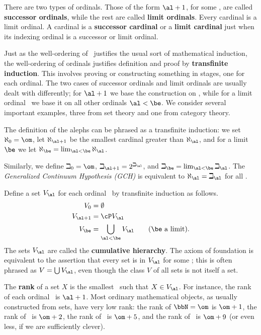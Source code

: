 \documentclass{amsart}
\begin{document}
There are two types of ordinals.  Those of the form $\al+1$, for some
\al, are called \textbf{successor ordinals}, while the rest are called
\textbf{limit ordinals}.  Every cardinal is a limit ordinal.  A
cardinal is a \textbf{successor cardinal} or a \textbf{limit cardinal}
just when its indexing ordinal is a successor or limit ordinal.

Just as the well-ordering of \bbN\ justifies the usual sort of
mathematical induction, the well-ordering of ordinals justifies
definition and proof by \textbf{transfinite induction}.  This involves
proving or constructing something in stages, one for each ordinal.
The two cases of successor ordinals and limit ordinals are usually
dealt with differently; for $\al+1$ we base the construction on \al,
while for a limit ordinal \be\ we base it on all other ordinals
$\al<\be$.  We consider several important examples, three from set
theory and one from category theory.

\begin{eg}\label{thm:aleph-beth}
  The definition of the alephs can be phrased as a transfinite
  induction: we set $\aleph_0=\om$, let $\aleph_{\al+1}$ be the
  smallest cardinal greater than $\aleph_\al$, and for a limit $\be$
  we let $\aleph_\be = \lim_{\al<\be} \aleph_\al$.

  Similarly, we define $\beth_0=\om$, $\beth_{\al+1} = 2^{\beth_\al}$,
  and $\beth_\be = \lim_{\al<\be} \beth_\al$.  The \emph{Generalized
    Continuum Hypothesis (GCH)} is equivalent to
  $\aleph_\al=\beth_\al$ for all \al.
\end{eg}

\begin{eg}
  Define a set $V_\al$ for each ordinal \al\ by transfinite induction
  as follows.
  \begin{align*}
    V_0 &= \emptyset\\
    V_{\al+1} &= \cP V_\al\\
    V_\be &= \bigcup_{\al<\be} V_\al \qquad\text{($\be$ a limit)}.
  \end{align*}
  The sets $V_\al$ are called the \textbf{cumulative hierarchy}.  The
  axiom of foundation is equivalent to the assertion that every set is
  in $V_\al$ for some \al; this is often phrased as $V=\bigcup V_\al$,
  even though the class $V$ of all sets is not itself a set.

  The \textbf{rank} of a set $X$ is the smallest \al\ such that $X\in
  V_\al$.  For instance, the rank of each ordinal \al\ is $\al+1$.
  Most ordinary mathematical objects, as usually constructed from
  sets, have very low rank: the rank of $\bbN=\om$ is $\om+1$, the
  rank of \bbZ\ is $\om+2$, the rank of \bbQ\ is $\om+5$, and the rank
  of \bbR\ is $\om+9$ (or even less, if we are sufficiently clever).
\end{eg}
\end{document}
